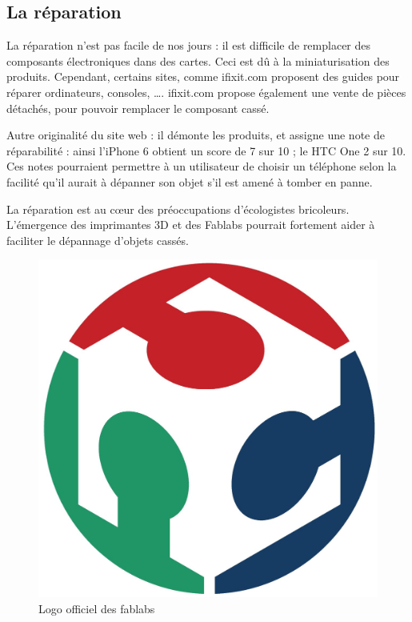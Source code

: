 \subsection{La réparation}
\label{ss::repartation}


La réparation n'est pas facile de nos jours : il est difficile de remplacer des composants électroniques dans des cartes. Ceci est dû à la miniaturisation des produits. Cependant, certains sites, comme ifixit.com proposent des guides pour réparer ordinateurs, consoles, \dots. ifixit.com propose également une vente de pièces détachés, pour pouvoir remplacer le composant cassé. 

Autre originalité du site web : il démonte les produits, et assigne une note de réparabilité : ainsi l'iPhone 6 obtient un score de 7 sur 10 ; le HTC One 2 sur 10.  Ces notes pourraient permettre à un utilisateur de choisir un téléphone selon la facilité qu'il aurait à dépanner son objet s'il est amené à tomber en panne. 
\medbreak

La réparation est au cœur des préoccupations d'écologistes bricoleurs. L'émergence des imprimantes 3D et des Fablabs pourrait fortement aider  à faciliter le dépannage d'objets cassés. 

\begin{figure}\begin{center}
\vspace{-0.7cm}\includegraphics[scale=0.33]{Rsc/logofablab.jpg} 

\caption{Logo officiel des fablabs}
\end{center}
\end{figure}


